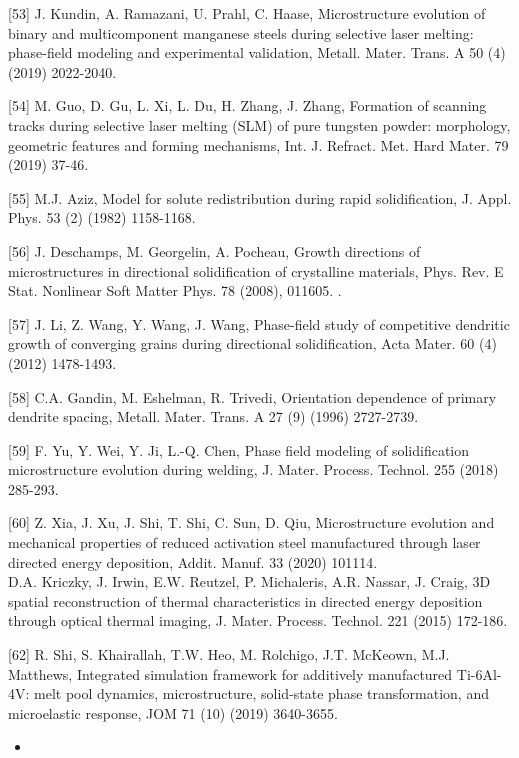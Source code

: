 \documentclass[10pt]{article}
\begin{document}
[53] J. Kundin, A. Ramazani, U. Prahl, C. Haase, Microstructure evolution of binary and multicomponent manganese steels during selective laser melting: phase-field modeling and experimental validation, Metall. Mater. Trans. A 50 (4) (2019) 2022-2040.

[54] M. Guo, D. Gu, L. Xi, L. Du, H. Zhang, J. Zhang, Formation of scanning tracks during selective laser melting (SLM) of pure tungsten powder: morphology, geometric features and forming mechanisms, Int. J. Refract. Met. Hard Mater. 79 (2019) 37-46.

[55] M.J. Aziz, Model for solute redistribution during rapid solidification, J. Appl. Phys. 53 (2) (1982) 1158-1168.

[56] J. Deschamps, M. Georgelin, A. Pocheau, Growth directions of microstructures in directional solidification of crystalline materials, Phys. Rev. E Stat. Nonlinear Soft Matter Phys. 78 (2008), 011605. .

[57] J. Li, Z. Wang, Y. Wang, J. Wang, Phase-field study of competitive dendritic growth of converging grains during directional solidification, Acta Mater. 60 (4) (2012) 1478-1493.

[58] C.A. Gandin, M. Eshelman, R. Trivedi, Orientation dependence of primary dendrite spacing, Metall. Mater. Trans. A 27 (9) (1996) 2727-2739.

[59] F. Yu, Y. Wei, Y. Ji, L.-Q. Chen, Phase field modeling of solidification microstructure evolution during welding, J. Mater. Process. Technol. 255 (2018) 285-293.

[60] Z. Xia, J. Xu, J. Shi, T. Shi, C. Sun, D. Qiu, Microstructure evolution and mechanical properties of reduced activation steel manufactured through laser directed energy deposition, Addit. Manuf. 33 (2020) 101114.\\
[61] D.A. Kriczky, J. Irwin, E.W. Reutzel, P. Michaleris, A.R. Nassar, J. Craig, 3D spatial reconstruction of thermal characteristics in directed energy deposition through optical thermal imaging, J. Mater. Process. Technol. 221 (2015) 172-186.

[62] R. Shi, S. Khairallah, T.W. Heo, M. Rolchigo, J.T. McKeown, M.J. Matthews, Integrated simulation framework for additively manufactured Ti-6Al-4V: melt pool dynamics, microstructure, solid-state phase transformation, and microelastic response, JOM 71 (10) (2019) 3640-3655.

\begin{itemize}
  \item 
\end{itemize}
\end{document}

